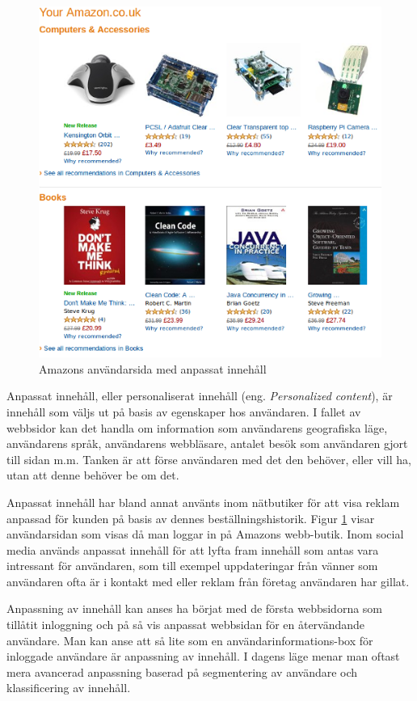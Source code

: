 \begin{figure}[h!]
\centering
\includegraphics[width=120mm]{assets/images/amazon.png}
\caption{Amazons användarsida med anpassat innehåll}
\label{amazon}
\end{figure}

Anpassat innehåll, eller personaliserat innehåll (eng. \textit{Personalized content}), är innehåll som väljs ut på basis av egenskaper hos användaren. I fallet av webbsidor kan det handla om information som användarens geografiska läge, användarens språk, användarens webbläsare, antalet besök som användaren gjort till sidan m.m. Tanken är att förse användaren med det den behöver, eller vill ha, utan att denne behöver be om det. \citep{cotacm43}

Anpassat innehåll har bland annat använts inom nätbutiker för att visa reklam anpassad för kunden på basis av dennes beställningshistorik. Figur \ref{amazon} visar användarsidan som visas då man loggar in på Amazons webb-butik. Inom social media används anpassat innehåll för att lyfta fram innehåll som antas vara intressant för användaren, som till exempel uppdateringar från vänner som användaren ofta är i kontakt med eller reklam från företag användaren har gillat. \citep{socialmedia}

Anpassning av innehåll kan anses ha börjat med de första webbsidorna som tillåtit inloggning och på så vis anpassat webbsidan för en återvändande användare. Man kan anse att så lite som en användarinformations-box för inloggade användare är anpassning av innehåll. I dagens läge menar man oftast mera avancerad anpassning baserad på segmentering av användare och klassificering av innehåll.

